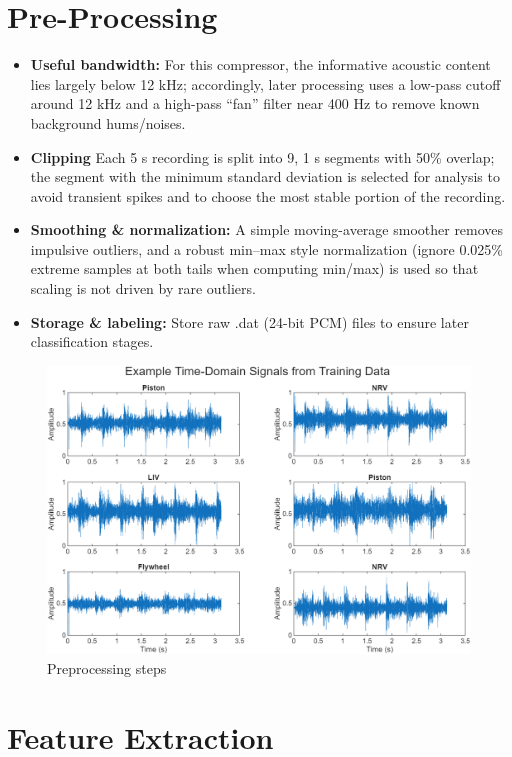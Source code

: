 \documentclass[12pt,a4paper]{article}
\begin{document}
\begin{multicols}{2}
\section{Pre-Processing}
\label{sec:preprocess}
\begin{itemize}
  \item \textbf{Useful bandwidth:} For this compressor, the informative acoustic content lies largely below 12 kHz; accordingly, later processing uses a low-pass cutoff around 12 kHz and a high-pass ``fan'' filter near 400 Hz to remove known background hums/noises.
  \item \textbf{Clipping} Each 5 s recording is split into 9, 1 s segments with 50\% overlap; the segment with the minimum standard deviation is selected for analysis to avoid transient spikes and to choose the most stable portion of the recording.
  \item \textbf{Smoothing \& normalization:} A simple moving-average smoother removes impulsive outliers, and a robust min–max style normalization (ignore 0.025\% extreme samples at both tails when computing min/max) is used so that scaling is not driven by rare outliers.
  \item \textbf{Storage \& labeling:} Store raw .dat (24-bit PCM) files to ensure later classification stages.
\end{itemize}
\begin{figure}[H]
    \centering
    \includegraphics[width=1\linewidth]{Diagrams/preprocessing.png}
    \caption{Preprocessing steps}
    \label{fig:preprocessing steps}
\end{figure}
\section{Feature Extraction}

\end{multicols}
\end{document}
